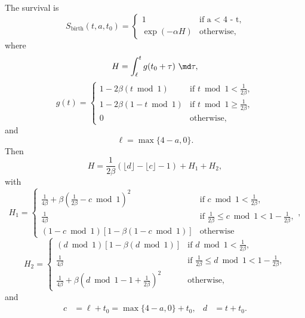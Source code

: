 \documentclass{jpmarticle}
\begin{document}
The survival is
\begin{equation}
  S_{\text{birth}}(t, a, t_0) =
  \begin{cases}
    1 & \text{if a < 4 - t},
    \\
    \exp(-\alpha H) & \text{otherwise},
  \end{cases}
\end{equation}
where
\begin{equation}
  H = \int_{\ell}^t g(t_0 + \tau)~\md \tau,
\end{equation}
\begin{equation}
  g (t) =
  \begin{cases}
    1 - 2 \beta (t \bmod 1)
    & \text{if $t \bmod 1 < \frac{1}{2 \beta}$},
    \\
    1 - 2 \beta (1 - t \bmod 1)
    & \text{if $t \bmod 1 \geq \frac{1}{2 \beta}$},
    \\
    0 & \text{otherwise},
  \end{cases}
\end{equation}
and
\begin{equation}
  \ell = \max\{4 - a, 0\}.
\end{equation}
Then
\begin{equation}
  H = \frac{1}{2 \beta} \left(\lfloor d \rfloor - \lfloor c \rfloor -
    1\right) + H_1 + H_2,
\end{equation}
with
\begin{equation}
  H_1 =
  \begin{cases}
    \frac{1}{4 \beta} + \beta \left(\frac{1}{2 \beta}
      - c \bmod 1\right)^2
    & \text{if $c \bmod 1 < \frac{1}{2 \beta}$},
    \\
    \frac{1}{4 \beta}
    & \text{if $\frac{1}{2 \beta} \leq c \bmod 1
      < 1 - \frac{1}{2 \beta}$},
    \\
    \left(1 - c \bmod 1\right) \left[1 -
      \beta \left(1 - c \bmod 1\right)\right]
    & \text{otherwise}
  \end{cases},
\end{equation}
\begin{equation}
  H_2 =
  \begin{cases}
    (d \bmod 1) \left[1 - \beta (d \bmod 1)\right]
    & \text{if $d \bmod 1 < \frac{1}{2 \beta}$},
    \\
    \frac{1}{4 \beta}
    & \text{if $\frac{1}{2 \beta} \leq d \bmod 1 <
      1 - \frac{1}{2 \beta}$},
    \\
    \frac{1}{4 \beta} + \beta \left(d \bmod 1 - 1
      + \frac{1}{2 \beta}\right)^2
    & \text{otherwise},
  \end{cases}
\end{equation}
and
\begin{align}
  c &= \ell + t_0 = \max\{4 - a, 0\} + t_0,
  &
  d &= t + t_0.
\end{align}
\end{document}

